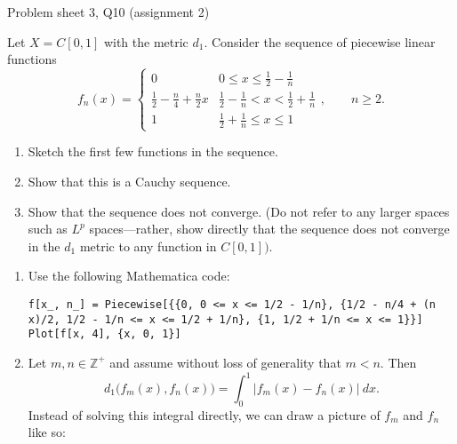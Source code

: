 \begin{problem}{Problem sheet 3, Q10 (assignment 2)}{}


    Let $X = C[0,1]$ with the metric $d_1$. Consider the sequence of piecewise linear functions
    $$ f_n(x) =
        \begin{cases}
            0 & 0 \leq x \leq \frac{1}{2} - \frac{1}{n} \\
            \frac{1}{2} - \frac{n}{4} + \frac{n}{2} x
                & \frac{1}{2} - \frac{1}{n} < x
                < \frac{1}{2} + \frac{1}{n} \\
            1 & \frac{1}{2} + \frac{1}{n} \leq x \leq 1
        \end{cases} ,
        \qquad n \geq 2 .
    $$
    \begin{enumerate}
        \item Sketch the first few functions in the sequence.
        \item Show that this is a Cauchy sequence.
        \item Show that the sequence does not converge. (Do not refer to any larger spaces such as $L^p$ spaces---rather, show directly that the sequence does not converge in the $d_1$ metric to any function in $C[0,1])$.
    \end{enumerate}

    \tcblower

    \begin{enumerate}
        \item Use the following Mathematica code:
        \begin{lstlisting}
f[x_, n_] = Piecewise[{{0, 0 <= x <= 1/2 - 1/n}, {1/2 - n/4 + (n x)/2, 1/2 - 1/n <= x <= 1/2 + 1/n}, {1, 1/2 + 1/n <= x <= 1}}]
Plot[f[x, 4], {x, 0, 1}]
        \end{lstlisting}
        \item Let $m, n \in \mathbb{Z}^+$ and assume without loss of generality that $m < n$. Then
            $$ d_1 \bigl( f_m(x), f_n(x) \bigr)
                = \int_0^1 \bigl\vert f_m(x) - f_n(x) \bigr\vert \ dx . $$
        Instead of solving this integral directly, we can draw a picture of $f_m$ and $f_n$ like so:

        \begin{center}
        \end{center}


\end{enumerate}
\end{problem}
